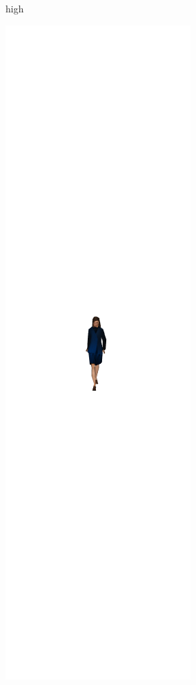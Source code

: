 \begin{figure}[h]
\begin{subfigure}[b]{.22\textwidth}
    \caption{high}
    \label{fig:woman1}
  \end{subfigure}
  \centering
  \begin{subfigure}[b]{.22\textwidth}
    \includegraphics[width=\textwidth]{figures/woman/cropped/2.png}

\end{subfigure}
\end{figure}
